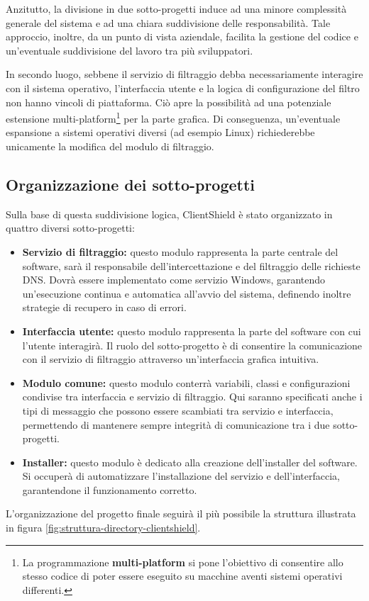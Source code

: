 \documentclass[12pt,a4paper,openright,twoside]{book}
\begin{document}
Anzitutto, la divisione in due sotto-progetti induce ad una minore complessità generale del sistema e ad una chiara suddivisione delle responsabilità.
Tale approccio, inoltre, da un punto di vista aziendale, facilita la gestione del codice e un'eventuale suddivisione del lavoro tra più sviluppatori.

In secondo luogo, sebbene il servizio di filtraggio debba necessariamente interagire con il sistema operativo, l'interfaccia utente e la logica di configurazione del filtro non hanno vincoli di piattaforma.
Ciò apre la possibilità ad una potenziale estensione multi-platform\footnote{La programmazione \textbf{multi-platform} si pone l'obiettivo di consentire allo stesso codice di poter essere eseguito su macchine aventi sistemi operativi differenti.} per la parte grafica.
Di conseguenza, un'eventuale espansione a sistemi operativi diversi (ad esempio Linux) richiederebbe unicamente la modifica del modulo di filtraggio.

\subsection{Organizzazione dei sotto-progetti}

Sulla base di questa suddivisione logica, ClientShield è stato organizzato in quattro diversi sotto-progetti:

\begin{itemize}
	\item \textbf{Servizio di filtraggio:}
	questo modulo rappresenta la parte centrale del software, sarà il responsabile dell'intercettazione e del filtraggio delle richieste \gls{DNS}.
	Dovrà essere implementato come servizio Windows, garantendo un'esecuzione continua e automatica all'avvio del sistema, definendo inoltre strategie di recupero in caso di errori.
	
	\item \textbf{Interfaccia utente:}
	questo modulo rappresenta la parte del software con cui l'utente interagirà.
	Il ruolo del sotto-progetto è di consentire la comunicazione con il servizio di filtraggio attraverso un'interfaccia grafica intuitiva.
	
	\item \textbf{Modulo comune:}
	questo modulo conterrà variabili, classi e configurazioni condivise tra interfaccia e servizio di filtraggio.
	Qui saranno specificati anche i tipi di messaggio che possono essere scambiati tra servizio e interfaccia, permettendo di mantenere sempre integrità di comunicazione tra i due sotto-progetti.
	
	\item \textbf{Installer:}
	questo modulo è dedicato alla creazione dell'installer del software.
	Si occuperà di automatizzare l'installazione del servizio e dell'interfaccia, garantendone il funzionamento corretto.
\end{itemize}
L'organizzazione del progetto finale seguirà il più possibile la struttura illustrata in figura \ref{fig:struttura-directory-clientshield}.
\end{document}
